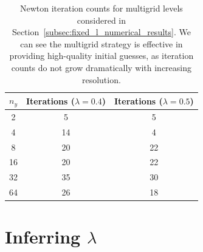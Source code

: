 \documentclass[12pt]{article}
\theoremstyle{definition}\newtheorem{lemma}{Lemma}
\begin{document}
\begin{table}[tbhp]
    \centering
    \begin{tabular}{c|c|c}
        \toprule
        $n_y$ & Iterations ($\lambda = 0.4$) & Iterations ($\lambda = 0.5$) \\
        \midrule
        2 & 5 & 5 \\
        4 & 14 & 4 \\
        8 & 20 & 22 \\
        16 & 20 & 22 \\
        32 & 35 & 30 \\
        64 & 26 & 18 \\
        \bottomrule
    \end{tabular}
    \caption{Newton iteration counts for multigrid levels considered in Section~\ref{subsec:fixed_l_numerical_results}. We can see the multigrid strategy is effective in providing high-quality initial guesses, as iteration counts do not grow dramatically with increasing resolution.}
    \label{tab:iterations}
\end{table}

\section{\label{sec:inference}Inferring $\lambda$}
\end{document}
